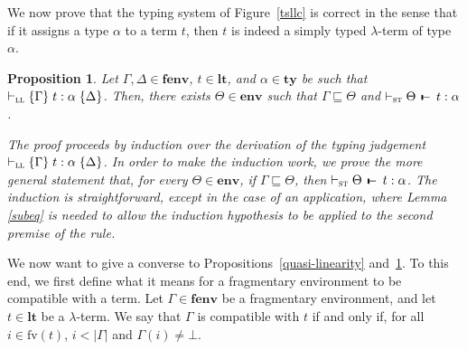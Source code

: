 \documentclass[submission,creativecommons]{eptcs}
\newtheorem{proposition}{Proposition}
\newcommand{\mybox}{\raisebox{3.5pt}{\framebox[7pt]{\rule{0mm}{0.3pt}}}}
\def\qed{\ifmmode\mybox\else{\unskip\nobreak\hfil
\penalty50\hskip1em\null\nobreak\hfil\mybox
\parfillskip=0pt\finalhyphendemerits=0\endgraf}\fi}
\newenvironment{proof}{%

\vspace{.7ex}
\noindent{\it Proof.} \rm}{\qed}
\def\joinrelm{\mathrel{\mkern-3mu}}
\def\relbar{\mathrel{\smash-}}
\def\tailpiece{\mathchoice
  {\vrule height 1ex width 0.3ex depth -.1ex}%
  {\vrule height 1ex width 0.3ex depth -.1ex}%
  {\vrule height 0.7ex width 0.3ex depth -.1ex}%
  {\vrule height 0.7ex width 0.3ex depth -.1ex}}
\def\seqsym{\mathrel{\tailpiece\joinrelm\relbar}}
\newcommand{\bt}{{\scriptstyle\bot}}
\newcommand{\tseq}[3]{#1 \, \seqsym \, #2 : #3}
\newcommand{\tytm}[4]{\{#1\}\;#2:#3\;\{#4\}}
\newcommand{\der}[1]{\vdash_{#1}}
\newcommand{\Sst}{{\textsc{st}}}
\newcommand{\Sll}{{\textsc{ll}}}
\newcommand{\ltm}{\mathord{\mathbf{lt}}}
\newcommand{\ty}{\mathord{\mathbf{ty}}}
\newcommand{\env}{\mathord{\mathbf{env}}}
\newcommand{\fenv}{\mathord{\mathbf{fenv}}}
\newcommand{\fv}[1]{\mathord{\mathrm{fv}}(#1)}
\begin{document}
We now prove that the typing system of Figure~\ref{tsllc} is correct in the sense that if it assigns a type $\alpha$ to a term $t$, then $t$ is indeed a simply typed $\lambda$-term of type $\alpha$.

\begin{proposition}\label{ll2st}
Let $\Gamma, \Delta\in\fenv$, $t\in\ltm$, and $\alpha\in\ty$ be such that $\der{\Sll}\tytm{\Gamma}{t}{\alpha}{\Delta}$.
Then, there exists $\Theta\in\env$ such that $\Gamma\sqsubseteq\Theta$ and
$\der{\Sst} \tseq{\Theta}{t}{\alpha}$.
\begin{proof}
The proof proceeds by induction over the derivation of the typing judgement $\der{\Sll}\tytm{\Gamma}{t}{\alpha}{\Delta}$.
In order to make the induction work, we prove the more general statement that, for every $\Theta\in\env$,
if $\Gamma\sqsubseteq\Theta$, then $\der{\Sst} \tseq{\Theta}{t}{\alpha}$. The induction is straightforward, except in the case
of an application, where Lemma \ref{subeq} is needed to allow the induction hypothesis to be applied to the second premise of
the rule.
\end{proof}
\end{proposition}

We now want to give a converse to Propositions~\ref{quasi-linearity} and~\ref{ll2st}. To this end, we first define what it means
for a fragmentary environment to be compatible with a term.
Let $\Gamma \in \fenv$ be a fragmentary environment, and let $t\in\ltm$ be a $\lambda$-term. We say that $\Gamma$ is compatible
with $t$ if and only if, for all $i\in\fv{t}$, $i<|\Gamma|$ and $\Gamma(i)\not=\bt$.
\end{document}
